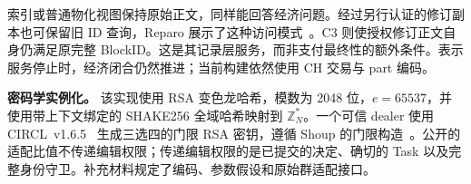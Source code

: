 索引或普通物化视图保持原始正文，同样能回答经济问题。经过另行认证的修订副本也可保留旧 ID 查询，Reparo 展示了这种访问模式~\cite{reparo}。C3 则使授权修订正文自身仍满足原完整 BlockID。这是其记录层服务，而非支付最终性的额外条件。表示服务停止时，经济闭合仍然推进；当前构建依然使用 CH 交易与 part 编码。

\noindent\textbf{密码学实例化。}
该实现使用 RSA 变色龙哈希，模数为 2048 位，$e=65537$，并使用带上下文绑定的 SHAKE256 全域哈希映射到 $\mathbb Z_N^*$。一个可信 dealer 使用 CIRCL~v1.6.5~\cite{circl} 生成三选四的门限 RSA 密钥，遵循 Shoup 的门限构造~\cite{shoup}。公开的适配比值不传递编辑权限；传递编辑权限的是已提交的决定、确切的 Task 以及完整身份守卫。补充材料规定了编码、参数假设和原始群适配接口。
